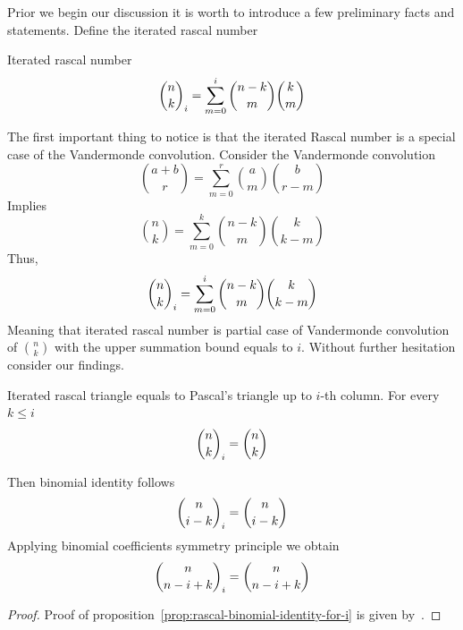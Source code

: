﻿Prior we begin our discussion it is worth to introduce a few preliminary facts and statements.
Define the iterated rascal number~\cite[eq. 3.2]{gregory2022iterated_Aequationes}
\begin{definition}
    Iterated rascal number
    \begin{align}
        \binom{n}{k}_{i} = \sum_{m=0}^{i} \binom{n-k}{m} \binom{k}{m}
    \end{align}
\end{definition}
The first important thing to notice is that the iterated Rascal number is a special case of the Vandermonde convolution.
Consider the Vandermonde convolution~\cite{andrews1999special}
\begin{equation*}
    \binom{a+b}{r} = \sum_{m=0}^{r} \binom{a}{m} \binom{b}{r-m}
\end{equation*}
Implies
\begin{equation*}
    \binom{n}{k} = \sum_{m=0}^{k} \binom{n-k}{m} \binom{k}{k-m}
\end{equation*}
Thus,
\begin{equation}
    \binom{n}{k}_{i} = \sum_{m=0}^{i} \binom{n-k}{m} \binom{k}{k-m}
    \label{eq:rascal-vandermonde-convolution}
\end{equation}
Meaning that iterated rascal number is partial case of Vandermonde convolution of $\binom{n}{k}$
with the upper summation bound equals to $i$.
Without further hesitation consider our findings.
\begin{proposition}
    \label{prop:rascal-binomial-identity-for-i}
    Iterated rascal triangle equals to Pascal's triangle up to $i$-th column.
    For every $k\leq i$
    \begin{equation}
        \binom{n}{k}_{i} = \binom{n}{k}
        \label{eq:rascal-column-identity}
    \end{equation}
\end{proposition}
Then binomial identity follows
\begin{align*}
    \binom{n}{i-k}_{i} = \binom{n}{i-k}
\end{align*}
Applying binomial coefficients symmetry principle we obtain
\begin{align*}
    \binom{n}{n-i+k}_{i} = \binom{n}{n-i+k}
\end{align*}
\begin{proof}
    Proof of proposition~\eqref{prop:rascal-binomial-identity-for-i}
    is given by~\cite[proposition 6.0.1]{gregory2023iterated}.
\end{proof}
